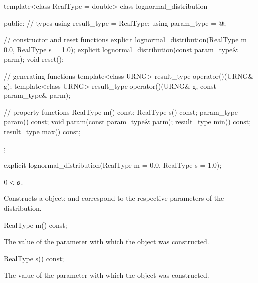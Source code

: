 \begin{codeblock}
template<class RealType = double>
 class lognormal_distribution
{
public:
 // types
 using result_type = RealType;
 using param_type  = @\unspec@;

 // constructor and reset functions
 explicit lognormal_distribution(RealType m = 0.0, RealType s = 1.0);
 explicit lognormal_distribution(const param_type& parm);
 void reset();

 // generating functions
 template<class URNG>
   result_type operator()(URNG& g);
 template<class URNG>
   result_type operator()(URNG& g, const param_type& parm);

 // property functions
 RealType m() const;
 RealType s() const;
 param_type param() const;
 void param(const param_type& parm);
 result_type min() const;
 result_type max() const;
};
\end{codeblock}


%
\begin{itemdecl}
explicit lognormal_distribution(RealType m = 0.0, RealType s = 1.0);
\end{itemdecl}

\begin{itemdescr}
\pnum\requires
 $ 0 < \texttt{s} $.

\pnum\effects Constructs a  object;
  and 
 correspond to the respective parameters of the distribution.
\end{itemdescr}

%
%
\begin{itemdecl}
RealType m() const;
\end{itemdecl}

\begin{itemdescr}
\pnum\returns The value of the  parameter
 with which the object was constructed.
\end{itemdescr}

%
%
\begin{itemdecl}
RealType s() const;
\end{itemdecl}

\begin{itemdescr}
\pnum\returns The value of the  parameter
 with which the object was constructed.
\end{itemdescr}

